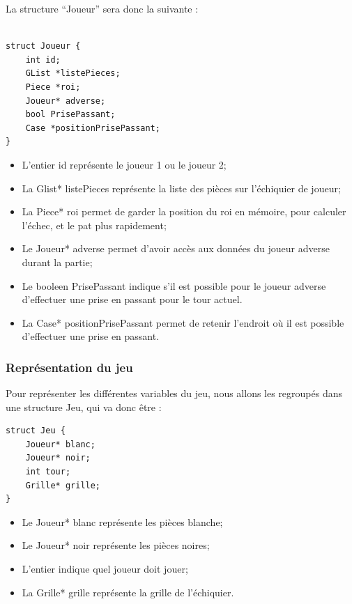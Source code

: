 \documentclass[12pt]{article}
\begin{document}
La structure ``Joueur'' sera donc la suivante :

\begin{lstlisting}

struct Joueur {
    int id;
    GList *listePieces;
    Piece *roi;
    Joueur* adverse;
    bool PrisePassant;
    Case *positionPrisePassant;
}
\end{lstlisting}

\begin{itemize}
\itemsep1pt\parskip0pt
\item
  L'entier id représente le joueur 1 ou le joueur 2;
\item
  La Glist* listePieces représente la liste des pièces sur l'échiquier
  de joueur;
\item
  La Piece* roi permet de garder la position du roi en mémoire, pour
  calculer l'échec, et le pat plus rapidement;
\item
  Le Joueur* adverse permet d'avoir accès aux données du joueur adverse
  durant la partie;
\item
  Le booleen PrisePassant indique s'il est possible pour le joueur
  adverse d'effectuer une prise en passant pour le tour actuel.
\item
  La Case* positionPrisePassant permet de retenir l'endroit où il est
  possible d'effectuer une prise en passant.
\end{itemize}

\subsubsection{Représentation du jeu}\label{repruxe9sentation-du-jeu}

Pour représenter les différentes variables du jeu, nous allons les
regroupés dans une structure Jeu, qui va donc être :

\begin{lstlisting}
struct Jeu {
    Joueur* blanc;
    Joueur* noir;
    int tour;
    Grille* grille;
}
\end{lstlisting}

\begin{itemize}
\itemsep1pt\parskip0pt
\item
  Le Joueur* blanc représente les pièces blanche;
\item
  Le Joueur* noir représente les pièces noires;
\item
  L'entier indique quel joueur doit jouer;
\item
  La Grille* grille représente la grille de l'échiquier.
\end{itemize}
\end{document}
